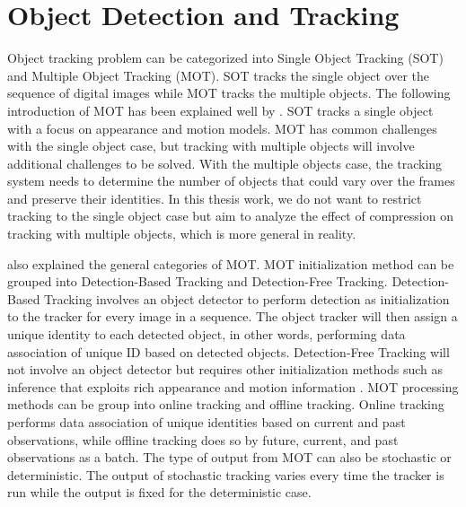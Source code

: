 \section{Object Detection and Tracking}
\label{sec:introduction/section_a}

Object tracking problem can be categorized into Single Object Tracking (SOT) and Multiple Object Tracking (MOT). SOT tracks the single object over the sequence of digital images while MOT tracks the multiple objects. The following introduction of MOT has been explained well by \citeauthor{luo_multiple_2021} \cite{luo_multiple_2021}. SOT tracks a single object with a focus on appearance and motion models. MOT has common challenges with the single object case, but tracking with multiple objects will involve additional challenges to be solved. With the multiple objects case, the tracking system needs to determine the number of objects that could vary over the frames and preserve their identities. In this thesis work, we do not want to restrict tracking to the single object case but aim to analyze the effect of compression on tracking with multiple objects, which is more general in reality.

\citeauthor{luo_multiple_2021} also explained the general categories of MOT. MOT initialization method can be grouped into Detection-Based Tracking and Detection-Free Tracking. Detection-Based Tracking involves an object detector to perform detection as initialization to the tracker for every image in a sequence. The object tracker will then assign a unique identity to each detected object, in other words, performing data association of unique ID based on detected objects. Detection-Free Tracking will not involve an object detector but requires other initialization methods such as inference that exploits rich appearance and motion information \cite{lin_detection-free_2016}. MOT processing methods can be group into online tracking and offline tracking. Online tracking performs data association of unique identities based on current and past observations, while offline tracking does so by future, current, and past observations as a batch. The type of output from MOT can also be stochastic or deterministic. The output of stochastic tracking varies every time the tracker is run while the output is fixed for the deterministic case.

